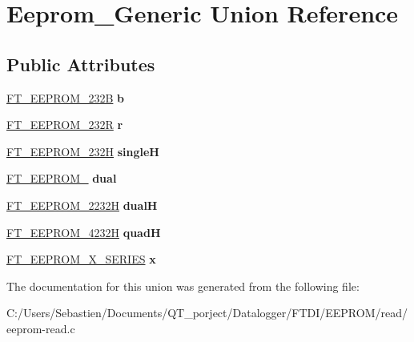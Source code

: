 \hypertarget{union_eeprom___generic}{}\section{Eeprom\+\_\+\+Generic Union Reference}
\label{union_eeprom___generic}
\subsection*{Public Attributes}
\begin{DoxyCompactItemize}
\item 
\mbox{\label{union_eeprom___generic_aa3845adfca52418ac95083ab7347d482}} 
\hyperlink{structft__eeprom__232b}{F\+T\+\_\+\+E\+E\+P\+R\+O\+M\+\_\+232B} {\bfseries b}
\item 
\mbox{\label{union_eeprom___generic_a42b67a6d79926dcf406329d97a08ab0e}} 
\hyperlink{structft__eeprom__232r}{F\+T\+\_\+\+E\+E\+P\+R\+O\+M\+\_\+232R} {\bfseries r}
\item 
\mbox{\label{union_eeprom___generic_aa2219fdb8f8af9ba1767471fb160a4f0}} 
\hyperlink{structft__eeprom__232h}{F\+T\+\_\+\+E\+E\+P\+R\+O\+M\+\_\+232H} {\bfseries singleH}
\item 
\mbox{\label{union_eeprom___generic_ac3fc69ce2bec032503806a062eab2163}} 
\hyperlink{structft__eeprom__2232}{F\+T\+\_\+\+E\+E\+P\+R\+O\+M\+\_} {\bfseries dual}
\item 
\mbox{\label{union_eeprom___generic_aabb53386bb933a92be92734a3cda36fc}} 
\hyperlink{structft__eeprom__2232h}{F\+T\+\_\+\+E\+E\+P\+R\+O\+M\+\_\+2232H} {\bfseries dualH}
\item 
\mbox{\label{union_eeprom___generic_a98f8bc673993bacef4fca5a7cc4ab4ce}} 
\hyperlink{structft__eeprom__4232h}{F\+T\+\_\+\+E\+E\+P\+R\+O\+M\+\_\+4232H} {\bfseries quadH}
\item 
\mbox{\label{union_eeprom___generic_a1183225adb3b3d8ca363527a3ec84856}} 
\hyperlink{structft__eeprom__x__series}{F\+T\+\_\+\+E\+E\+P\+R\+O\+M\+\_\+\+X\+\_\+\+S\+E\+R\+I\+ES} {\bfseries x}
\end{DoxyCompactItemize}


The documentation for this union was generated from the following file\+:\begin{DoxyCompactItemize}
\item 
C\+:/\+Users/\+Sebastien/\+Documents/\+Q\+T\+\_\+porject/\+Datalogger/\+F\+T\+D\+I/\+E\+E\+P\+R\+O\+M/read/eeprom-\/read.\+c\end{DoxyCompactItemize}
